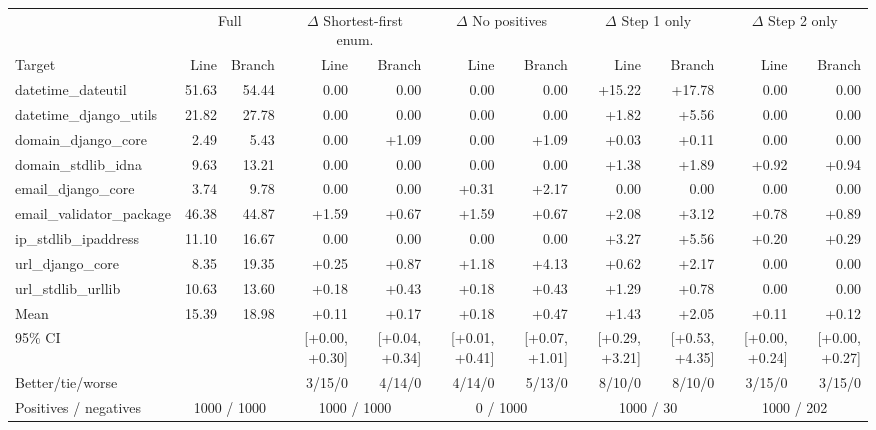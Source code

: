 \begin{tabular}{l rr rr rr rr rr}
\toprule
 & \multicolumn{2}{c}{Full} & \multicolumn{2}{c}{$\Delta$ Shortest-first enum.} & \multicolumn{2}{c}{$\Delta$ No positives} & \multicolumn{2}{c}{$\Delta$ Step 1 only} & \multicolumn{2}{c}{$\Delta$ Step 2 only} \\
\cmidrule(lr){2-3}\cmidrule(lr){4-5}\cmidrule(lr){6-7}\cmidrule(lr){8-9}\cmidrule(lr){10-11}
Target & Line & Branch & Line & Branch & Line & Branch & Line & Branch & Line & Branch \\
\midrule
datetime\_dateutil & 51.63 & 54.44 & \phantom{+}0.00 & \phantom{+}0.00 & \phantom{+}0.00 & \phantom{+}0.00 & +15.22 & +17.78 & \phantom{+}0.00 & \phantom{+}0.00 \\
datetime\_django\_utils & 21.82 & 27.78 & \phantom{+}0.00 & \phantom{+}0.00 & \phantom{+}0.00 & \phantom{+}0.00 & +1.82 & +5.56 & \phantom{+}0.00 & \phantom{+}0.00 \\
domain\_django\_core & 2.49 & 5.43 & \phantom{+}0.00 & +1.09 & \phantom{+}0.00 & +1.09 & +0.03 & +0.11 & \phantom{+}0.00 & \phantom{+}0.00 \\
domain\_stdlib\_idna & 9.63 & 13.21 & \phantom{+}0.00 & \phantom{+}0.00 & \phantom{+}0.00 & \phantom{+}0.00 & +1.38 & +1.89 & +0.92 & +0.94 \\
email\_django\_core & 3.74 & 9.78 & \phantom{+}0.00 & \phantom{+}0.00 & +0.31 & +2.17 & \phantom{+}0.00 & \phantom{+}0.00 & \phantom{+}0.00 & \phantom{+}0.00 \\
email\_validator\_package & 46.38 & 44.87 & +1.59 & +0.67 & +1.59 & +0.67 & +2.08 & +3.12 & +0.78 & +0.89 \\
ip\_stdlib\_ipaddress & 11.10 & 16.67 & \phantom{+}0.00 & \phantom{+}0.00 & \phantom{+}0.00 & \phantom{+}0.00 & +3.27 & +5.56 & +0.20 & +0.29 \\
url\_django\_core & 8.35 & 19.35 & +0.25 & +0.87 & +1.18 & +4.13 & +0.62 & +2.17 & \phantom{+}0.00 & \phantom{+}0.00 \\
url\_stdlib\_urllib & 10.63 & 13.60 & +0.18 & +0.43 & +0.18 & +0.43 & +1.29 & +0.78 & \phantom{+}0.00 & \phantom{+}0.00 \\
\midrule
Mean & 15.39 & 18.98 & +0.11 & +0.17 & +0.18 & +0.47 & +1.43 & +2.05 & +0.11 & +0.12 \\
95\% CI & & & [+0.00, +0.30] & [+0.04, +0.34] & [+0.01, +0.41] & [+0.07, +1.01] & [+0.29, +3.21] & [+0.53, +4.35] & [+0.00, +0.24] & [+0.00, +0.27] \\
Better/tie/worse & & & 3/15/0 & 4/14/0 & 4/14/0 & 5/13/0 & 8/10/0 & 8/10/0 & 3/15/0 & 3/15/0 \\
Positives / negatives & \multicolumn{2}{c}{1000 / 1000} & \multicolumn{2}{c}{1000 / 1000} & \multicolumn{2}{c}{0 / 1000} & \multicolumn{2}{c}{1000 / 30} & \multicolumn{2}{c}{1000 / 202} \\
\bottomrule
\end{tabular}
